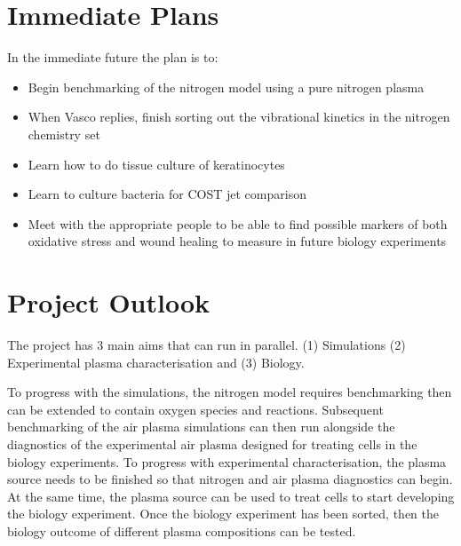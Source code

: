 \documentclass[11pt, oneside]{article}   	%
\begin{document}
\section{Immediate Plans}
In the immediate future the plan is to:
\begin{itemize}
\item Begin benchmarking of the nitrogen model using a pure nitrogen plasma
\item When Vasco replies, finish sorting out the vibrational kinetics in the nitrogen chemistry set
\item Learn how to do tissue culture of keratinocytes
\item Learn to culture bacteria for COST jet comparison
\item Meet with the appropriate people to be able to find possible markers of both oxidative stress and wound healing to measure in future biology experiments
\end{itemize}



\section{Project Outlook}
The project has 3 main aims that can run in parallel. (1) Simulations (2) Experimental plasma characterisation and (3) Biology.

To progress with the simulations, the nitrogen model requires benchmarking then can be extended to contain oxygen species and reactions.
Subsequent benchmarking of the air plasma simulations can then run alongside the diagnostics of the experimental air plasma designed for treating cells in the biology experiments.
To progress with experimental characterisation, the plasma source needs to be finished so that nitrogen and air plasma diagnostics can begin.
At the same time, the plasma source can be used to treat cells to start developing the biology experiment.
Once the biology experiment has been sorted, then the biology outcome of different plasma compositions can be tested.
\end{document}
